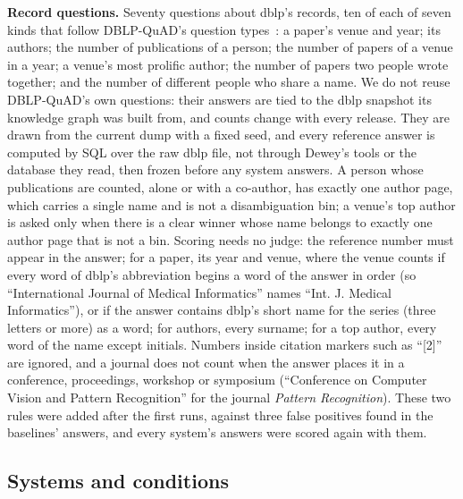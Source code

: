 \documentclass[conference]{IEEEtran}
\begin{document}
\textbf{Record questions.}
\label{sec:structured}
Seventy questions about dblp's records, ten of each of seven kinds that follow DBLP-QuAD's question
types~\cite{banerjee2023dblpquad}: a paper's venue and year; its authors; the number of publications of a
person; the number of papers of a venue in a year; a venue's most prolific author; the number of papers
two people wrote together; and the number of different people who share a name. We do not reuse DBLP-QuAD's own questions: their
answers are tied to the dblp snapshot its knowledge graph was built from, and counts change with every
release. They are drawn from the
current dump with a fixed seed, and every reference answer is computed by SQL over the raw dblp file, not
through Dewey's tools or the database they read, then frozen before any system answers. A person whose
publications are counted, alone or with a co-author, has exactly one author page, which carries a single
name and is not a disambiguation bin; a venue's top author is asked only when there is a clear winner
whose name belongs to exactly one author page that is not a bin. Scoring needs no judge: the reference number must
appear in the answer; for a paper, its year and venue, where the venue counts if every word of dblp's
abbreviation begins a word of the answer in order (so ``International Journal of Medical Informatics''
names ``Int. J. Medical Informatics''), or if the answer contains dblp's short name for the series (three
letters or more) as a word; for authors, every surname; for a top author, every word of the name except
initials. Numbers inside citation markers such as ``[2]'' are ignored, and a journal does not count when
the answer places it in a conference, proceedings, workshop or symposium (``Conference on Computer Vision
and Pattern Recognition'' for the journal \emph{Pattern Recognition}). These two rules were added after
the first runs, against three false positives found in the baselines' answers, and every system's answers
were scored again with them.

\subsection{Systems and conditions}
\end{document}
